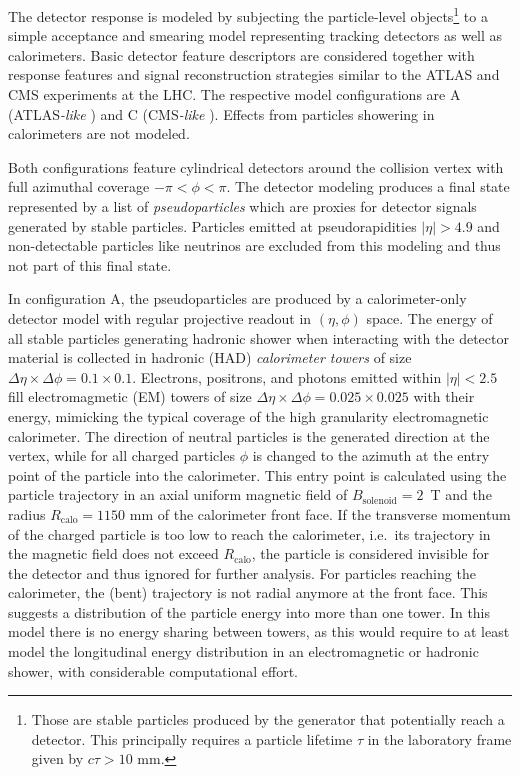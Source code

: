 The detector response is modeled by subjecting the particle-level objects\footnote{Those are stable particles produced by the generator that potentially reach a detector.  This principally requires a particle lifetime $\tau$ in the laboratory frame given by $c\tau > 10$ mm.}
to a simple acceptance and smearing model representing tracking detectors as well as calorimeters.
%
Basic detector feature descriptors are considered together with response features and signal reconstruction strategies similar to the ATLAS and CMS experiments at the LHC.
%
The respective model configurations are A (ATLAS{\emph{-like}} \cite{PERF-2007-01}) and C (CMS\emph{-like} \cite{CMS-TDR-08-001}).
%
Effects from particles showering in calorimeters are not modeled. 

Both configurations feature cylindrical detectors around the collision vertex with full azimuthal coverage $-\pi < \phi < \pi$.
The detector modeling produces a final state represented by a list of \emph{pseudoparticles} which are proxies for detector signals generated by stable particles.
Particles emitted at pseudorapidities $|\eta| > 4.9$ and non-detectable particles like neutrinos are excluded from this modeling and thus not part of this final state. 

In configuration A, the pseudoparticles are produced by a calorimeter-only detector model with regular projective readout in $(\eta,\phi)$ space. 
The energy of all stable particles generating hadronic shower when interacting with the detector material is collected 
in hadronic (HAD) \emph{calorimeter towers} of size $\Delta\eta\times\Delta\phi = 0.1\times0.1$. 
Electrons, positrons, and photons emitted within $|\eta| < 2.5$ fill electromagmetic (EM) towers of size $\Delta\eta\times\Delta\phi = 0.025\times0.025$ with their energy, mimicking the typical
coverage of the high granularity electromagnetic calorimeter. 
The direction of neutral particles is the generated direction at the vertex, while for all charged particles $\phi$ is changed to the azimuth at the entry point of the particle
into the calorimeter. 
This entry point is calculated using the particle trajectory in an axial uniform magnetic field of $B_{\text{solenoid}} = 2$~T and the radius $R_{\text{calo}} = 1150$ mm of
 the calorimeter front face.
If the transverse momentum of the charged particle  is too low to reach the calorimeter, i.e.\ its trajectory in the magnetic field does not exceed $R_{\text{calo}}$, 
the particle is considered invisible for the detector and thus ignored for further analysis.   
For particles reaching the calorimeter, the (bent) trajectory is not radial anymore at the front face.
This suggests a distribution of the particle energy into more than one tower.
In this model there is no energy sharing between towers, as this would require to at least model the longitudinal energy distribution in an electromagnetic or hadronic shower, with considerable computational effort.

